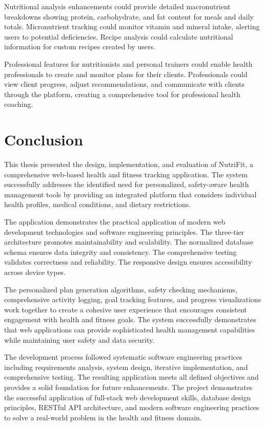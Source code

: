 Nutritional analysis enhancements could provide detailed macronutrient breakdowns showing protein, carbohydrate, and fat content for meals and daily totals. Micronutrient tracking could monitor vitamin and mineral intake, alerting users to potential deficiencies. Recipe analysis could calculate nutritional information for custom recipes created by users.

Professional features for nutritionists and personal trainers could enable health professionals to create and monitor plans for their clients. Professionals could view client progress, adjust recommendations, and communicate with clients through the platform, creating a comprehensive tool for professional health coaching.

\section{Conclusion}

This thesis presented the design, implementation, and evaluation of NutriFit, a comprehensive web-based health and fitness tracking application. The system successfully addresses the identified need for personalized, safety-aware health management tools by providing an integrated platform that considers individual health profiles, medical conditions, and dietary restrictions.

The application demonstrates the practical application of modern web development technologies and software engineering principles. The three-tier architecture promotes maintainability and scalability. The normalized database schema ensures data integrity and consistency. The comprehensive testing validates correctness and reliability. The responsive design ensures accessibility across device types.

The personalized plan generation algorithms, safety checking mechanisms, comprehensive activity logging, goal tracking features, and progress visualizations work together to create a cohesive user experience that encourages consistent engagement with health and fitness goals. The system successfully demonstrates that web applications can provide sophisticated health management capabilities while maintaining user safety and data security.

The development process followed systematic software engineering practices including requirements analysis, system design, iterative implementation, and comprehensive testing. The resulting application meets all defined objectives and provides a solid foundation for future enhancements. The project demonstrates the successful application of full-stack web development skills, database design principles, RESTful API architecture, and modern software engineering practices to solve a real-world problem in the health and fitness domain.
